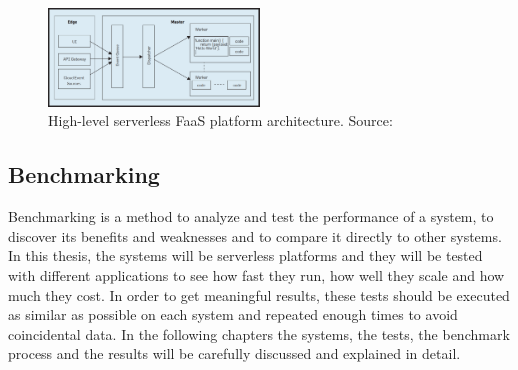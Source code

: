 \begin{figure}[htp]
\begin{center}
\includegraphics[width=0.5\textwidth]{bilder/FaaS_architecture.png}
\captionsetup[table]{justification=centering, labelfont=bf}
\caption[High-level serverless FaaS platform architecture]{High-level serverless FaaS platform architecture. Source: \cite{riseofserverless}}
\label{fig:faas_achritecture}
\end{center}
\end{figure}

\subsection{Benchmarking}
Benchmarking is a method to analyze and test the performance of a system, to discover its benefits and weaknesses and to compare it directly to other systems. In this thesis, the systems will be serverless platforms and they will be tested with different applications to see how fast they run, how well they scale and how much they cost. In order to get meaningful results, these tests should be executed as similar as possible on each system and repeated enough times to avoid coincidental data. In the following chapters the systems, the tests, the benchmark process and the results will be carefully discussed and explained in detail.


